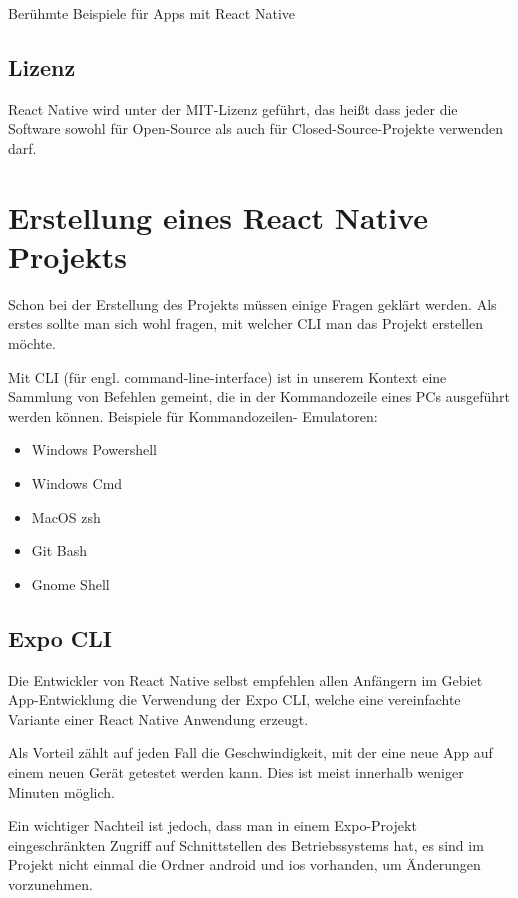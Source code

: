 \begin{center}
  Berühmte Beispiele für Apps mit React Native \cite{reactNativeShowcase}
\end{center}

\subsection{Lizenz}
React Native wird unter der MIT-Lizenz geführt, das heißt dass jeder die Software sowohl für
Open-Source als auch für Closed-Source-Projekte verwenden darf.

\section{Erstellung eines React Native Projekts}
Schon bei der Erstellung des Projekts müssen einige Fragen geklärt werden. Als erstes sollte man
sich wohl fragen, mit welcher CLI man das Projekt erstellen möchte.

Mit CLI (für engl. command-line-interface) ist in unserem Kontext eine Sammlung von Befehlen
gemeint, die in der Kommandozeile eines PCs ausgeführt werden können. Beispiele für Kommandozeilen-
Emulatoren:

\begin{itemize}
  \item Windows Powershell
  \item Windows Cmd
  \item MacOS zsh
  \item Git Bash
  \item Gnome Shell
\end{itemize}

\subsection{Expo CLI}
Die Entwickler von React Native selbst empfehlen allen Anfängern im Gebiet App-Entwicklung die
Verwendung der Expo CLI, welche eine vereinfachte Variante einer React Native Anwendung erzeugt.

Als Vorteil zählt auf jeden Fall die Geschwindigkeit, mit der eine neue App auf einem neuen Gerät
getestet werden kann. Dies ist meist innerhalb weniger Minuten möglich.

Ein wichtiger Nachteil ist jedoch, dass man in einem Expo-Projekt eingeschränkten Zugriff auf
Schnittstellen des Betriebssystems hat, es sind im Projekt nicht einmal die Ordner android und ios
vorhanden, um Änderungen vorzunehmen.

